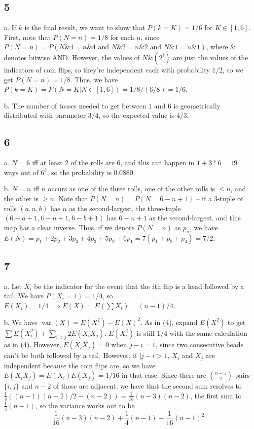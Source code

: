 \documentclass{article}
\DeclareMathOperator{\var}{var}
\begin{document}
\subsection*{5}
a. If $k$ is the final result, we want to show that $P(k=K)=1/6$ for $K\in[1,6]$. First, note that $P(N=n)=1/8$ for each $n$, since $P(N=n)=P(N\&4=n\&4\text{ and }N\&2=n\&2\text{ and }N\&1=n\&1)$, where $\&$ denotes bitwise AND. However, the values of $N\&(2^i)$ are just the values of the indicators of coin flips, so they're independent each with probability $1/2$, so we get $P(N=n)=1/8$. Thus, we have $P(k=K)=P(N=K|N\in[1,6])=1/8/(6/8)=1/6$.

b. The number of tosses needed to get between $1$ and $6$ is geometrically distributed with parameter $3/4$, so the expected value is $4/3$.
\subsection*{6}
a. $N=6$ iff at least 2 of the rolls are $6$, and this can happen in $1+3*6=19$ ways out of $6^3$, so the probability is $0.0880$.

b. $N=n$ iff $n$ occurs as one of the three rolls, one of the other rolls is $\leq n$, and the other is $\geq n$. Note that $P(N=n)=P(N=6-n+1)$ -- if a 3-tuple of rolls $(a,n,b)$ has $n$ as the second-largest, the three-tuple $(6-a+1,6-n+1,6-b+1)$ has $6-n+1$ as the second-largest, and this map has a clear inverse. Thus, if we denote $P(N=n)$ as $p_n$, we have $E(N)=p_1+2p_2+3p_3+4p_3+5p_2+6p_1=7(p_1+p_2+p_3)=7/2$.
\subsection*{7}
a. Let $X_i$ be the indicator for the event that the $i$th flip is a head followed by a tail. We have $P(X_i=1)=1/4$, so $E(X_i)=1/4\implies E(X)=E(\sum X_i)=(n-1)/4$.

b. We have $\var(X)=E(X^2)-E(X)^2$. As in (4), expand $E(X^2)$ to get $\sum E(X_i^2)+\sum_{i<j}2E(X_iX_j)$. $E(X_i^2)$ is still $1/4$ with the same calculation as in (4). However, $E(X_iX_j)=0$ when $j-i=1$, since two consecutive heads can't be both followed by a tail. However, if $|j-i>1$, $X_i$ and $X_j$ are independent because the coin flips are, so we have $E(X_iX_j)=E(X_i)E(X_j)=1/16$ in that case. Since there are $\binom{n-1}{2}$ pairs $\{i,j\}$ and $n-2$ of those are adjacent, we have that the second sum resolves to $\frac{1}{8}((n-1)(n-2)/2-(n-2))=\frac{1}{16}(n-3)(n-2)$, the first sum to $\frac{1}{4}(n-1)$, so the variance works out to be 
$$\frac{1}{16}(n-3)(n-2)+\frac{1}{4}(n-1)-\frac{1}{16}(n-1)^2$$
\end{document}
